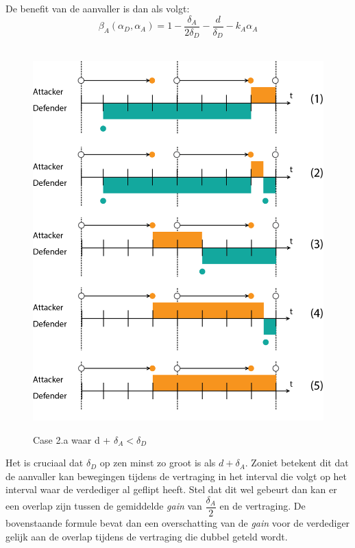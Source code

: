 \documentclass[master=cws, masteroption=vs,english]{kulemt}
\begin{document}
\begin{abstract*}
De benefit van de aanvaller is dan als volgt:
\begin{equation}\label{first}
\beta_{A}(\alpha_{D},\alpha_{A}) = 1 -\dfrac{\delta_{A}}{2\delta_{D}} - \dfrac{d}{\delta_{D}} - k_{A} \alpha_{A} 
\end{equation}\\

\begin{figure}[hbtp]
\caption{Case 2.a waar d + $\delta_{A} < \delta_{D}$}
\centering
\includegraphics[scale=0.5]{../../doc/template/Images/FlipItCase2.png}
\label{fig:case2}
\end{figure}


Het is cruciaal dat $ \delta_{D}$ op zen minst zo groot is als $d + \delta_{A}$. Zoniet betekent dit dat de aanvaller kan bewegingen tijdens de vertraging in het interval die volgt op het interval waar de verdediger al geflipt heeft. Stel dat dit wel gebeurt dan kan er een overlap zijn tussen de gemiddelde \textit{gain} van $\dfrac{\delta_{A}}{2}$ en de vertraging. De bovenstaande formule bevat dan een overschatting van de \textit{gain} voor de verdediger gelijk aan de overlap tijdens de vertraging die dubbel geteld wordt. \\



\end{abstract*}
\end{document}
